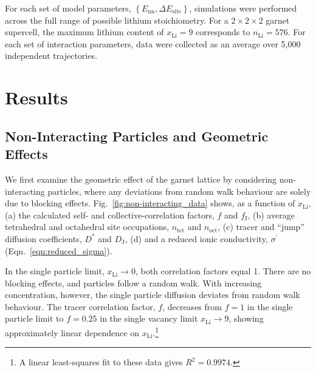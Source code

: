 \documentclass[aps,prb,twocolumn,superscriptaddress,reprint]{revtex4-1}
\newcommand{\set}[1]{\left\{#1\right\}}
\newcommand{\xLi}{x_\m{Li}}
\newcommand{\m}[1]{\mathrm{#1}}
\begin{document}
For each set of model parameters, $\set{E_\m{nn}, \Delta E_\m{site}}$, simulations were performed across the full range of possible lithium stoichiometry. For a $2\times2\times2$ garnet supercell, the maximum lithium content of $\xLi=9$ corresponds to $n_\m{Li}=576$. 
For each set of interaction parameters, data were collected as an average over 5,000 independent trajectories. 

\section{Results}
\subsection{Non-Interacting Particles and Geometric Effects}

We first examine the geometric effect of the garnet lattice by considering non-interacting particles, where any deviations from random walk behaviour are solely due to blocking effects.
Fig.~\ref{fig:non-interacting_data}  shows, as a function of $\xLi$, (a) the calculated self- and collective-correlation factors, $f$ and $f_\m{I}$, (b) average tetrahedral and octahedral site occupations, $n_\m{tet}$ and $n_\m{oct}$, (c) tracer and ``jump'' diffusion coefficients, $D^*$ and $D_\m{J}$, (d) and a reduced ionic conductivity, $\sigma^\prime$ (Eqn.~\ref{eqn:reduced_sigma}).

In the single particle limit, $\xLi\to0$, both correlation factors equal 1. There are no blocking effects, and particles follow a random walk. 
With increasing concentration, however, the single particle diffusion deviates from random walk behaviour. 
The tracer correlation factor, $f$, decreases from $f=1$ in the single particle limit to $f=0.25$ in the single vacancy limit $\xLi\to9$, showing approximately linear dependence on $\xLi$.\footnote{A linear least-squares fit to these data gives $R^2=0.9974$.}
\end{document}
